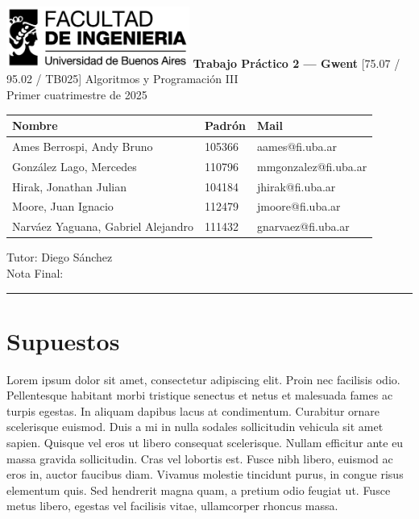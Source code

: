 \documentclass[titlepage,a4paper]{article}
\begin{document}
\begin{titlepage} %
	\hfill\includegraphics[width=6cm]{logofiuba.jpg}
    \centering
    \vfill
    \Huge \textbf{Trabajo Práctico 2 — Gwent}
    \vskip2cm
    \Large [75.07 / 95.02 / TB025] Algoritmos y Programación III\\
    Primer cuatrimestre de 2025 
    \vfill
    \begin{tabular}{ | l | l | l | }
      \hline
      \textbf{Nombre} & \textbf{Padrón} & \textbf{Mail} \\ \hline
      Ames Berrospi, Andy Bruno & 105366 & aames@fi.uba.ar \\ \hline
      González Lago, Mercedes & 110796 & mmgonzalez@fi.uba.ar \\ \hline
      Hirak, Jonathan Julian & 104184 & jhirak@fi.uba.ar \\ \hline
      Moore, Juan Ignacio & 112479 & jmoore@fi.uba.ar \\ \hline
      Narváez Yaguana, Gabriel Alejandro & 111432 & gnarvaez@fi.uba.ar \\ \hline
    \end{tabular}
    
    \vspace{1cm}
    \begin{flushleft}
    Tutor: Diego Sánchez \\
    \vspace{0.5cm}
    Nota Final: \rule{2cm}{0.4pt}
    \end{flushleft}
    \vfill
    \vfill
\end{titlepage}

\tableofcontents %
\newpage

\section{Supuestos}\label{sec:supuestos}

Lorem ipsum dolor sit amet, consectetur adipiscing elit. Proin nec facilisis odio. Pellentesque habitant morbi tristique senectus et netus et malesuada fames ac turpis egestas. In aliquam dapibus lacus at condimentum. Curabitur ornare scelerisque euismod. Duis a mi in nulla sodales sollicitudin vehicula sit amet sapien. Quisque vel eros ut libero consequat scelerisque. Nullam efficitur ante eu massa gravida sollicitudin. Cras vel lobortis est. Fusce nibh libero, euismod ac eros in, auctor faucibus diam. Vivamus molestie tincidunt purus, in congue risus elementum quis. Sed hendrerit magna quam, a pretium odio feugiat ut. Fusce metus libero, egestas vel facilisis vitae, ullamcorper rhoncus massa.
\end{document}
